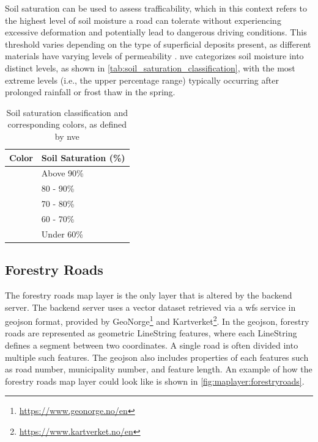 Soil saturation can be used to assess \gls{trafficability}, which in this context refers to the highest level of soil moisture a road can tolerate without experiencing excessive deformation and potentially lead to dangerous driving conditions. This threshold varies depending on the type of superficial deposits present, as different materials have varying levels of permeability \cite{fjeld2023trafficability}. \acrshort{nve} categorizes soil moisture into distinct levels, as shown in \autoref{tab:soil_saturation_classification}, with the most extreme levels (i.e., the upper percentage range) typically occurring after prolonged rainfall or frost thaw in the spring.

\begin{table}[h]
    \centering
    \begin{tabular}{|l|l|}
        \hline  
        \textbf{Color} & \textbf{Soil Saturation (\%)} \\
        \hline
        \cellcolor[HTML]{f82200} & Above 90\% \\
        \hline
        \cellcolor[HTML]{f8c400} & 80 - 90\% \\
        \hline
        \cellcolor[HTML]{f8fc00} & 70 - 80\% \\
        \hline
        \cellcolor[HTML]{29d460} & 60 - 70\% \\
        \hline
        \cellcolor[HTML]{e4e4e4} & Under 60\% \\
        \hline
    \end{tabular}
    \caption[Soil saturation classification and corresponding colors]{Soil saturation classification and corresponding colors, as defined by \acrshort{nve} \cite{nve2025waterdata}}
    \label{tab:soil_saturation_classification}
\end{table}

\subsection{Forestry Roads}

The forestry roads map layer is the only layer that is altered by the backend server. The backend server uses a vector dataset retrieved via a \Gls{wfs} service in \gls{geojson} format, provided by GeoNorge\footnote{\url{https://www.geonorge.no/en}} and Kartverket\footnote{\url{https://www.kartverket.no/en}}. In the \gls{geojson}, forestry roads are represented as geometric LineString features, where each LineString defines a segment between two coordinates. A single road is often divided into multiple such features. The \gls{geojson} also includes properties of each features such as road number, municipality number, and feature length. An example of how the forestry roads map layer could look like is shown in \autoref{fig:maplayer:forestryroads}.

